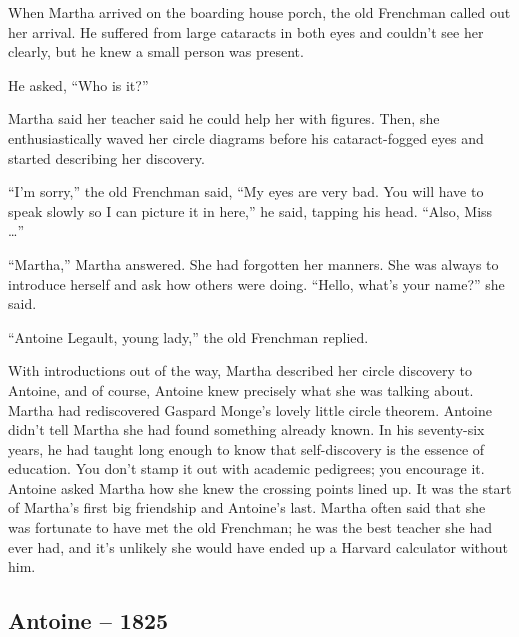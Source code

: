 When Martha arrived on the boarding house porch, the old Frenchman
called out her arrival. He suffered from large cataracts in both eyes
and couldn't see her clearly, but he knew a small person was present.

He asked, ``Who is it?''

Martha said her teacher said he could help her with figures. Then, she
enthusiastically waved her circle diagrams before his cataract-fogged
eyes and started describing her discovery.

``I'm sorry,'' the old Frenchman said, ``My eyes are very bad. You will
have to speak slowly so I can picture it in here,'' he said, tapping his
head. ``Also, Miss \ldots''

``Martha,'' Martha answered. She had forgotten her manners. She was
always to introduce herself and ask how others were doing. ``Hello,
what's your name?'' she said.

``Antoine Legault, young lady,'' the old Frenchman replied.

With introductions out of the way, Martha described her circle discovery
to Antoine, and of course, Antoine knew precisely what she was talking
about. Martha had rediscovered Gaspard Monge's lovely little circle
theorem. Antoine didn't tell Martha she had found something already
known. In his seventy-six years, he had taught long enough to know that
self-discovery is the essence of education. You don't stamp it out with
academic pedigrees; you encourage it. Antoine asked Martha how she knew
the crossing points lined up. It was the start of Martha's first big
friendship and Antoine's last. Martha often said that she was fortunate
to have met the old Frenchman; he was the best teacher she had ever had,
and it's unlikely she would have ended up a Harvard calculator without
him.

\hypertarget{antoine-1825}{%
\subsection*{Antoine -- 1825}\label{antoine-1825}}

